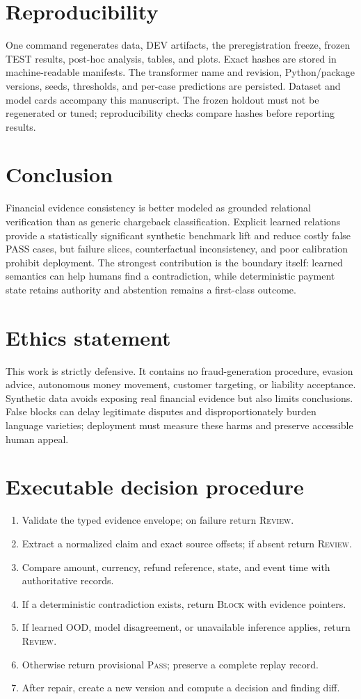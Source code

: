 \documentclass[10pt,twocolumn]{article}
\newcommand{\pass}{\textsc{Pass}}
\newcommand{\review}{\textsc{Review}}
\newcommand{\block}{\textsc{Block}}
\begin{document}
\section{Reproducibility}
One command regenerates data, DEV artifacts, the preregistration freeze, frozen TEST results, post-hoc analysis, tables, and plots. Exact hashes are stored in machine-readable manifests. The transformer name and revision, Python/package versions, seeds, thresholds, and per-case predictions are persisted. Dataset and model cards accompany this manuscript. The frozen holdout must not be regenerated or tuned; reproducibility checks compare hashes before reporting results.

\section{Conclusion}
Financial evidence consistency is better modeled as grounded relational verification than as generic chargeback classification. Explicit learned relations provide a statistically significant synthetic benchmark lift and reduce costly false PASS cases, but failure slices, counterfactual inconsistency, and poor calibration prohibit deployment. The strongest contribution is the boundary itself: learned semantics can help humans find a contradiction, while deterministic payment state retains authority and abstention remains a first-class outcome.

\section*{Ethics statement}
This work is strictly defensive. It contains no fraud-generation procedure, evasion advice, autonomous money movement, customer targeting, or liability acceptance. Synthetic data avoids exposing real financial evidence but also limits conclusions. False blocks can delay legitimate disputes and disproportionately burden language varieties; deployment must measure these harms and preserve accessible human appeal.

\appendix
\section{Executable decision procedure}
\begin{enumerate}
\item Validate the typed evidence envelope; on failure return \review.
\item Extract a normalized claim and exact source offsets; if absent return \review.
\item Compare amount, currency, refund reference, state, and event time with authoritative records.
\item If a deterministic contradiction exists, return \block{} with evidence pointers.
\item If learned OOD, model disagreement, or unavailable inference applies, return \review.
\item Otherwise return provisional \pass; preserve a complete replay record.
\item After repair, create a new version and compute a decision and finding diff.
\end{enumerate}
\end{document}
